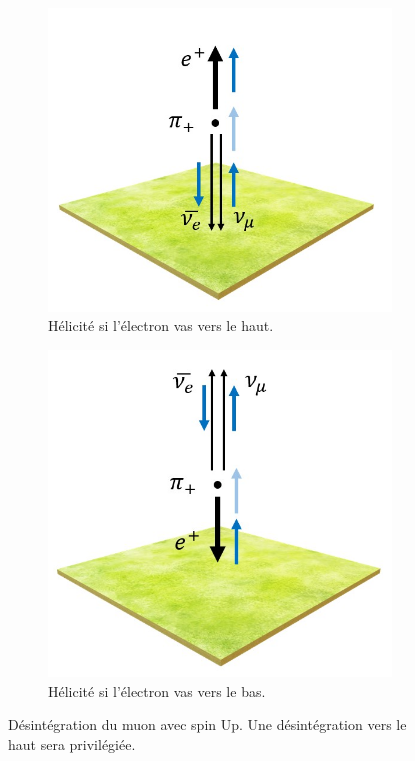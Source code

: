 \documentclass[12pt]{article}
\begin{document}
\begin{figure}[htbp!] 
\centering  
    \begin{subfigure}[t]{.45\textwidth}
    \includegraphics[width=.9\textwidth]{Images/Photos/HeliciteElecUp.jpg}
    \captionsetup{width=0.9\textwidth}
    \caption{Hélicité si l'électron vas vers le haut.}
    \label{fig:HeliciteElecUp}
    \end{subfigure}
    \begin{subfigure}[t]{.45\textwidth}
    \includegraphics[width=.9\textwidth]{Images/Photos/HeliciteElecDown.jpg}
    \captionsetup{width=0.9\textwidth}
    \caption{Hélicité si l'électron vas vers le bas.}
    \label{fig:HeliciteElecDown}
    \end{subfigure}
\caption{Désintégration du muon avec spin Up. Une désintégration vers le haut sera privilégiée.}
\label{HelicitéElecUpDown}
\end{figure}
\end{document}
